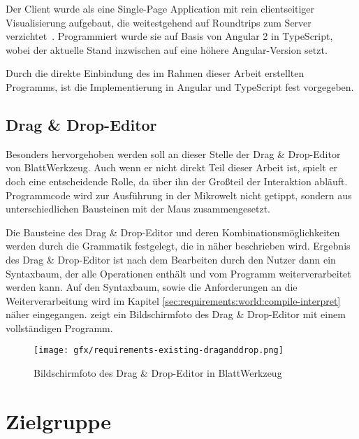 Der Client wurde als eine Single-Page Application mit rein clientseitiger Visualisierung aufgebaut, die weitestgehend auf Roundtrips zum Server verzichtet~\cite[94-95]{riemer2016}. Programmiert wurde sie auf Basis von Angular 2 in TypeScript, wobei der aktuelle Stand inzwischen auf eine höhere Angular-Version setzt.

Durch die direkte Einbindung des im Rahmen dieser Arbeit erstellten Programms, ist die Implementierung in Angular und TypeScript fest vorgegeben.

\subsection{Drag \& Drop-Editor}
\label{sec:requirements:existing:structure:drag-drop}

Besonders hervorgehoben werden soll an dieser Stelle der Drag \& Drop-Editor von BlattWerkzeug. Auch wenn er nicht direkt Teil dieser Arbeit ist, spielt er doch eine entscheidende Rolle, da über ihn der Großteil der Interaktion abläuft. Programmcode wird zur Ausführung in der Mikrowelt nicht getippt, sondern aus unterschiedlichen Bausteinen mit der Maus zusammengesetzt.

Die Bausteine des Drag \& Drop-Editor und deren Kombinationsmöglichkeiten werden durch die Grammatik festgelegt, die in  näher beschrieben wird. Ergebnis des Drag \& Drop-Editor ist nach dem Bearbeiten durch den Nutzer dann ein Syntaxbaum, der alle Operationen enthält und vom Programm weiterverarbeitet werden kann. Auf den Syntaxbaum, sowie die Anforderungen an die Weiterverarbeitung wird im Kapitel \ref{sec:requirements:world:compile-interpret} näher eingegangen.  zeigt ein Bildschirmfoto des Drag \& Drop-Editor mit einem vollständigen Programm.

\begin{figure}[h]
    \centering
    \texttt{[image: gfx/requirements-existing-draganddrop.png]}
    \caption{Bildschirmfoto des Drag \& Drop-Editor in BlattWerkzeug}
    \label{fig:requirements:existing:draganddrop}
\end{figure}

\section{Zielgruppe}
\label{sec:requirements:target}

